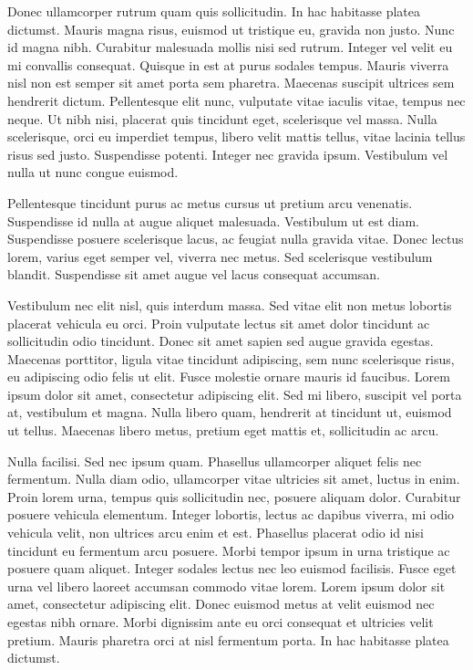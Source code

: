 \documentclass[12pt]{article}
\begin{document}
Donec ullamcorper rutrum quam quis sollicitudin. In hac habitasse platea dictumst. Mauris magna risus, euismod ut tristique eu, gravida non justo. Nunc id magna nibh. Curabitur malesuada mollis nisi sed rutrum. Integer vel velit eu mi convallis consequat. Quisque in est at purus sodales tempus. Mauris viverra nisl non est semper sit amet porta sem pharetra. Maecenas suscipit ultrices sem hendrerit dictum. Pellentesque elit nunc, vulputate vitae iaculis vitae, tempus nec neque. Ut nibh nisi, placerat quis tincidunt eget, scelerisque vel massa. Nulla scelerisque, orci eu imperdiet tempus, libero velit mattis tellus, vitae lacinia tellus risus sed justo. Suspendisse potenti. Integer nec gravida ipsum. Vestibulum vel nulla ut nunc congue euismod.

Pellentesque tincidunt purus ac metus cursus ut pretium arcu venenatis. Suspendisse id nulla at augue aliquet malesuada. Vestibulum ut est diam. Suspendisse posuere scelerisque lacus, ac feugiat nulla gravida vitae. Donec lectus lorem, varius eget semper vel, viverra nec metus. Sed scelerisque vestibulum blandit. Suspendisse sit amet augue vel lacus consequat accumsan.

Vestibulum nec elit nisl, quis interdum massa. Sed vitae elit non metus lobortis placerat vehicula eu orci. Proin vulputate lectus sit amet dolor tincidunt ac sollicitudin odio tincidunt. Donec sit amet sapien sed augue gravida egestas. Maecenas porttitor, ligula vitae tincidunt adipiscing, sem nunc scelerisque risus, eu adipiscing odio felis ut elit. Fusce molestie ornare mauris id faucibus. Lorem ipsum dolor sit amet, consectetur adipiscing elit. Sed mi libero, suscipit vel porta at, vestibulum et magna. Nulla libero quam, hendrerit at tincidunt ut, euismod ut tellus. Maecenas libero metus, pretium eget mattis et, sollicitudin ac arcu.

Nulla facilisi. Sed nec ipsum quam. Phasellus ullamcorper aliquet felis nec fermentum. Nulla diam odio, ullamcorper vitae ultricies sit amet, luctus in enim. Proin lorem urna, tempus quis sollicitudin nec, posuere aliquam dolor. Curabitur posuere vehicula elementum. Integer lobortis, lectus ac dapibus viverra, mi odio vehicula velit, non ultrices arcu enim et est. Phasellus placerat odio id nisi tincidunt eu fermentum arcu posuere. Morbi tempor ipsum in urna tristique ac posuere quam aliquet. Integer sodales lectus nec leo euismod facilisis. Fusce eget urna vel libero laoreet accumsan commodo vitae lorem. Lorem ipsum dolor sit amet, consectetur adipiscing elit. Donec euismod metus at velit euismod nec egestas nibh ornare. Morbi dignissim ante eu orci consequat et ultricies velit pretium. Mauris pharetra orci at nisl fermentum porta. In hac habitasse platea dictumst.
\end{document}
